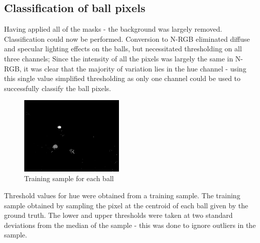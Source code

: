 \documentclass[10pt,a4paper,oneclumn]{article}
\begin{document}
\subsection{Classification of ball pixels}

Having applied all of the masks - the background was largely removed. Classification could now be performed. Conversion to N-RGB eliminated diffuse and specular lighting effects on the balls, but necessitated thresholding on all three channels; Since the intensity of all the pixels was largely the same in N-RGB, it was clear that the majority of variation lies in the hue channel - using this single value simplified thresholding as only one channel could be used to successfully classify the ball pixels. 

\begin{figure}[h!]
\centering
  \includegraphics[width=5cm]{figures/bgremoved.png}
\caption{Training sample for each ball}
\end{figure}

Threshold values for hue were obtained from a training sample. The training sample obtained by sampling the pixel at the centroid of each ball given by the ground truth. The lower and upper thresholds were taken at two standard deviations from the median of the sample - this was done to ignore outliers in the sample.
\end{document}
